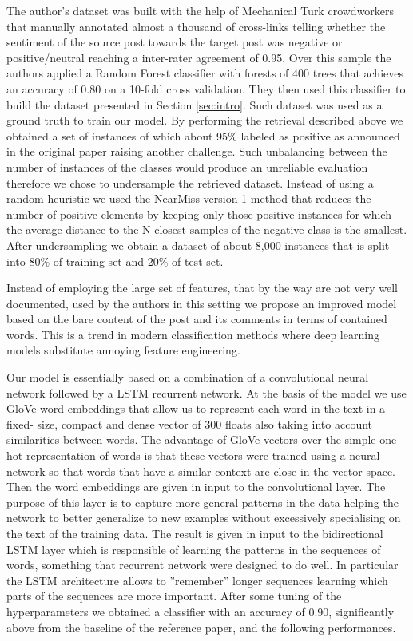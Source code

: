 \documentclass{article}
\begin{document}
The author's dataset was built with the help of Mechanical Turk crowdworkers
that manually annotated almost a thousand of cross-links telling whether the
sentiment of the source post towards the target post was negative or
positive/neutral reaching a inter-rater agreement of 0.95. Over this sample the
authors applied a Random Forest classifier with forests of 400 trees that
achieves an accuracy of 0.80 on a 10-fold cross validation. They then used this
classifier to build the dataset presented in Section \ref{sec:intro}. Such
dataset was used as a ground
truth to train our model. By performing the retrieval described above we
obtained a set of instances of which about 95\% labeled as positive as
announced in the original paper raising another challenge. Such unbalancing
between the number of
instances of the classes would produce an unreliable evaluation therefore we
chose to undersample the retrieved dataset. Instead of using a random heuristic
we used the NearMiss version 1 method that reduces the number of positive
elements by keeping only those positive instances for which the average distance
to the N closest samples of the negative class is the smallest. After
undersampling we obtain a dataset of about 8,000 instances that is split into
80\% of training set and 20\% of test set.

Instead of employing the large set of features, that by the way are not
very well documented, used by the authors in this setting we propose an improved
model based on the bare content of the post and its comments in terms of
contained words. This is a trend in modern classification methods
where deep learning models substitute annoying feature engineering.


Our model is essentially based on a combination of a convolutional
neural network followed by a LSTM recurrent network. At the basis of the model we
use GloVe word embeddings that allow us to represent each word in the text in a fixed-
size, compact and dense vector of 300 floats also taking into account
similarities between
words. The advantage of GloVe vectors over the simple one-hot representation of words
is that these vectors were trained using a neural network so that words that have a
similar context are close in the vector space. Then the word embeddings are given in 
input to the convolutional layer. The purpose
of this layer is to capture more general patterns in the data helping the network to better
generalize to new examples without excessively specialising on the text of the training
data. The result is given in input to the bidirectional LSTM layer which is responsible
of learning the patterns in the sequences of words, something that recurrent network
were designed to do well. In particular the LSTM architecture allows to ”remember”
longer sequences learning which parts of the sequences are more important. After
some tuning of the hyperparameters we obtained a classifier with an accuracy of
0.90, significantly above from the baseline of the reference paper, and the
following performances.
\end{document}
